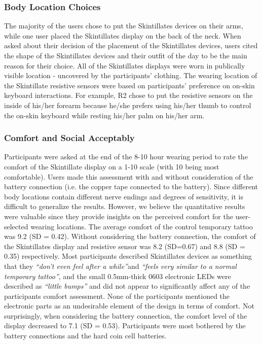 \documentclass{sigchi}
\begin{document}
\subsubsection{Body Location Choices}
The majority of the users chose to put the Skintillates devices on their arms, while one user placed the Skintillates display on the back of the neck. When asked about their decision of the placement of the Skintillates devices, users cited the shape of the Skintillates devices and their outfit of the day to be the main reason for their choice. All of the Skintillates displays were worn in publically visible location - uncovered by the participants’ clothing. The wearing location of the Skintillate resistive sensors were based on participants’ preference on on-skin keyboard interactions. For example, R2 chose to put the resistive sensors on the inside of his/her forearm because he/she prefers using his/her thumb to control the on-skin keyboard while resting his/her palm on his/her arm. 
\subsubsection{Comfort and Social Acceptably}
Participants were asked at the end of the 8-10 hour wearing period to rate the comfort of the Skintillate display on a 1-10 scale (with 10 being most comfortable).  Users made this assessment with and without consideration of the battery connection (i.e. the copper tape connected to the battery). Since different body locations contain different nerve endings and degrees of sensitivity, it is difficult to generalize the results.  However, we believe the quantitative results were valuable since they provide insights on the perceived comfort for the user-selected wearing locations. 
The average comfort of the control temporary tattoo was 9.2 (SD = 0.42). Without considering the battery connection, the comfort of the Skintillates display and resistive sensor was 8.2 (SD=0.67) and 8.8 (SD = 0.35) respectively. Most participants described Skintillates devices as something that they \textit{“don’t even feel after a while”}and \textit{“feels very similar to a normal temporary tattoo”}, and the small 0.5mm-thick 0603 electronic LEDs were described as \textit{“little bumps”} and did not appear to significantly affect any of the participants comfort assessment.  None of the participants mentioned the electronic parts as an undesirable element of the design in terms of comfort.
Not surprisingly, when considering the battery connection, the comfort level of the display decreased to 7.1 (SD = 0.53). Participants were most bothered by the battery connections and the hard coin cell batteries. 
\end{document}
